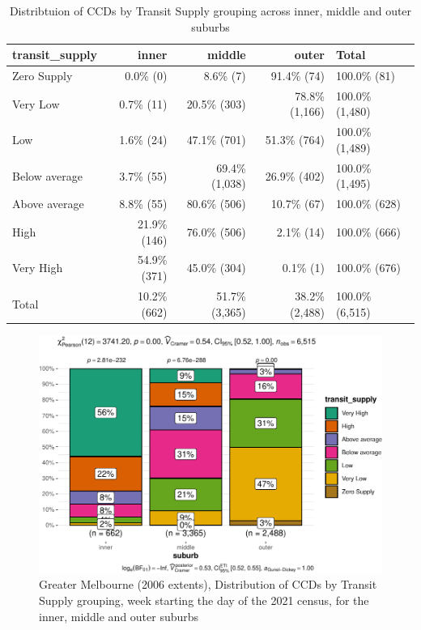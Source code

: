 \documentclass[preprint, 3p,
authoryear]{elsarticle} %
\begin{document}
\begin{table}

\caption{\label{tab:Greater_Melbourne_CCD_2021_by_suburbs}Distribtuion of CCDs by Transit Supply grouping across inner, middle and outer suburbs}
\centering
\begin{tabular}[t]{l|r|r|r|l}
\hline
transit\_supply & inner & middle & outer & Total\\
\hline
Zero Supply & 0.0\%   (0) & 8.6\%     (7) & 91.4\%    (74) & 100.0\%    (81)\\
\hline
Very Low & 0.7\%  (11) & 20.5\%   (303) & 78.8\% (1,166) & 100.0\% (1,480)\\
\hline
Low & 1.6\%  (24) & 47.1\%   (701) & 51.3\%   (764) & 100.0\% (1,489)\\
\hline
Below average & 3.7\%  (55) & 69.4\% (1,038) & 26.9\%   (402) & 100.0\% (1,495)\\
\hline
Above average & 8.8\%  (55) & 80.6\%   (506) & 10.7\%    (67) & 100.0\%   (628)\\
\hline
High & 21.9\% (146) & 76.0\%   (506) & 2.1\%    (14) & 100.0\%   (666)\\
\hline
Very High & 54.9\% (371) & 45.0\%   (304) & 0.1\%     (1) & 100.0\%   (676)\\
\hline
Total & 10.2\% (662) & 51.7\% (3,365) & 38.2\% (2,488) & 100.0\% (6,515)\\
\hline
\end{tabular}
\end{table}

\begin{figure}
\includegraphics[width=1\linewidth]{Leveraging_GTFS_to_assess_transit_supply_Transport_Geography_files/figure-latex/Greater_Melbourne_CCD_2021_by_suburbs-1} \caption{Greater Melbourne (2006 extents), Distribution of CCDs by Transit Supply grouping, week starting the day of the 2021 census, for the inner, middle and outer suburbs}\label{fig:Greater_Melbourne_CCD_2021_by_suburbs}
\end{figure}
\end{document}
